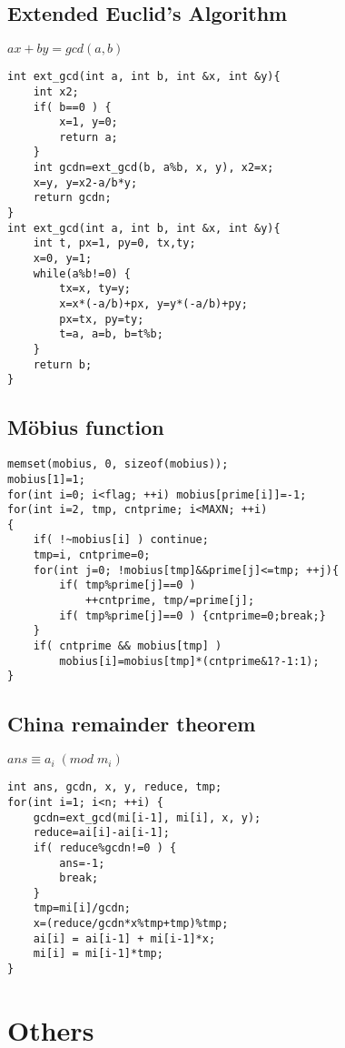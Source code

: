 \documentclass[11pt,twocolumn,a4paper]{article}
\begin{document}
\subsection{Extended Euclid’s Algorithm}
$ ax+by=gcd(a,b) $
\begin{lstlisting}[label=Extended Euclid’s Algorithm]
int ext_gcd(int a, int b, int &x, int &y){
	int x2;
	if( b==0 ) {
		x=1, y=0;
		return a;
	}
	int gcdn=ext_gcd(b, a%b, x, y), x2=x;
	x=y, y=x2-a/b*y;
	return gcdn;
}
int ext_gcd(int a, int b, int &x, int &y){
	int t, px=1, py=0, tx,ty;
	x=0, y=1;
	while(a%b!=0) {
		tx=x, ty=y;
		x=x*(-a/b)+px, y=y*(-a/b)+py;
		px=tx, py=ty;
		t=a, a=b, b=t%b;
	}
	return b;
}
\end{lstlisting}

\subsection{Möbius function}
\begin{lstlisting}[label=Möbius function]
memset(mobius, 0, sizeof(mobius));
mobius[1]=1;
for(int i=0; i<flag; ++i) mobius[prime[i]]=-1;
for(int i=2, tmp, cntprime; i<MAXN; ++i)
{
	if( !~mobius[i] ) continue;
	tmp=i, cntprime=0;
	for(int j=0; !mobius[tmp]&&prime[j]<=tmp; ++j){
		if( tmp%prime[j]==0 )
			++cntprime, tmp/=prime[j];
		if( tmp%prime[j]==0 ) {cntprime=0;break;}
	}
	if( cntprime && mobius[tmp] )
		mobius[i]=mobius[tmp]*(cntprime&1?-1:1);
}
\end{lstlisting}

\subsection{China remainder theorem}
$ ans \equiv  a_i\; (mod\; m_i) $
\begin{lstlisting}[label=China remainder theorem]
int ans, gcdn, x, y, reduce, tmp;
for(int i=1; i<n; ++i) {	
	gcdn=ext_gcd(mi[i-1], mi[i], x, y);
	reduce=ai[i]-ai[i-1];
	if( reduce%gcdn!=0 ) {
		ans=-1;
		break;
	}
	tmp=mi[i]/gcdn;
	x=(reduce/gcdn*x%tmp+tmp)%tmp;
	ai[i] = ai[i-1] + mi[i-1]*x;
	mi[i] = mi[i-1]*tmp;
}
\end{lstlisting}


\newpage
\section{Others}
\end{document}
